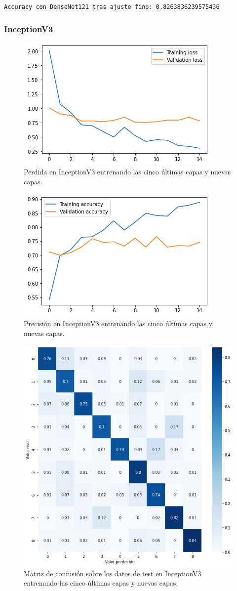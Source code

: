 \begin{lstlisting}
Accuracy con DenseNet121 tras ajuste fino: 0.8263836239575436
\end{lstlisting}



\subsubsection{InceptionV3}


\begin{figure}[H]
  \centering
  \includegraphics[width=0.5\linewidth]{Imagenes/entrenamiento_redes/5-ult/inception_5ult_loss.png}
  \caption{Perdida en InceptionV3 entrenando las cinco últimas capas y nuevas capas.}
\end{figure}

\begin{figure}[H]
  \centering
  \includegraphics[width=0.5\linewidth]{Imagenes/entrenamiento_redes/5-ult/inception_5ult_acc.png}
  \caption{Precisión en InceptionV3 entrenando las cinco últimas capas y nuevas capas.}
\end{figure}

\begin{figure}[H]
  \centering
  \includegraphics[width=0.5\linewidth]{Imagenes/entrenamiento_redes/5-ult/inception_5ult_matriz.png}
  \caption{Matriz de confusión sobre los datos de test en InceptionV3 entrenando las cinco últimas capas y nuevas capas.}
\end{figure}


